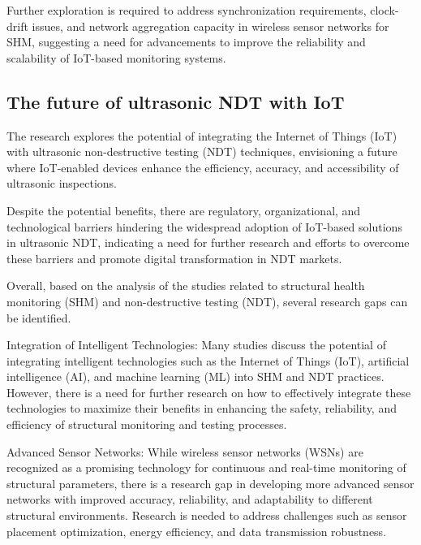 \documentclass[journal, a4paper]{IEEEtran}
\begin{document}
\begin{description}[style=standard, font=\normalfont]
  \item[Research gap:] Further exploration is required to address synchronization requirements, clock-drift issues, and network aggregation capacity in wireless sensor networks for SHM, suggesting a need for advancements to improve the reliability and scalability of IoT-based monitoring systems.
\end{description}
 

\subsection{The future of ultrasonic NDT with IoT}
The research explores the potential of integrating the Internet of Things (IoT) with ultrasonic non-destructive testing (NDT) techniques, envisioning a future where IoT-enabled devices enhance the efficiency, accuracy, and accessibility of ultrasonic inspections. 

\begin{description}[style=standard, font=\normalfont]
  \item[Research gap:] Despite the potential benefits, there are regulatory, organizational, and technological barriers hindering the widespread adoption of IoT-based solutions in ultrasonic NDT, indicating a need for further research and efforts to overcome these barriers and promote digital transformation in NDT markets.  
\end{description}


Overall, based on the analysis of the studies related to structural health monitoring (SHM) and non-destructive testing (NDT), several research gaps can be identified. 

Integration of Intelligent Technologies: Many studies discuss the potential of integrating intelligent technologies such as the Internet of Things (IoT), artificial intelligence (AI), and machine learning (ML) into SHM and NDT practices. However, there is a need for further research on how to effectively integrate these technologies to maximize their benefits in enhancing the safety, reliability, and efficiency of structural monitoring and testing processes. 

Advanced Sensor Networks: While wireless sensor networks (WSNs) are recognized as a promising technology for continuous and real-time monitoring of structural parameters, there is a research gap in developing more advanced sensor networks with improved accuracy, reliability, and adaptability to different structural environments. Research is needed to address challenges such as sensor placement optimization, energy efficiency, and data transmission robustness. 
\end{document}
